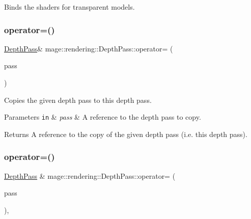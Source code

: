 Binds the shaders for transparent models. \mbox{\label{classmage_1_1rendering_1_1_depth_pass_a10cc86e94eb5425f0323b989c33514b7}} 
\subsubsection{\texorpdfstring{operator=()}{operator=()}\hspace{0.1cm}{\footnotesize\ttfamily [1/2]}}
{\footnotesize\ttfamily \mbox{\hyperlink{classmage_1_1rendering_1_1_depth_pass}{Depth\+Pass}}\& mage\+::rendering\+::\+Depth\+Pass\+::operator= (\begin{DoxyParamCaption}\item[{const \mbox{\hyperlink{classmage_1_1rendering_1_1_depth_pass}{Depth\+Pass}} \&}]{pass }\end{DoxyParamCaption})\hspace{0.3cm}{\ttfamily [delete]}}

Copies the given depth pass to this depth pass.


\begin{DoxyParams}[1]{Parameters}
\mbox{\tt in}  & {\em pass} & A reference to the depth pass to copy. \\
\hline
\end{DoxyParams}
\begin{DoxyReturn}{Returns}
A reference to the copy of the given depth pass (i.\+e. this depth pass). 
\end{DoxyReturn}
\mbox{\label{classmage_1_1rendering_1_1_depth_pass_a937bc6669a2bd856e7ff9c396e0afe77}} 
\subsubsection{\texorpdfstring{operator=()}{operator=()}\hspace{0.1cm}{\footnotesize\ttfamily [2/2]}}
{\footnotesize\ttfamily \mbox{\hyperlink{classmage_1_1rendering_1_1_depth_pass}{Depth\+Pass}} \& mage\+::rendering\+::\+Depth\+Pass\+::operator= (\begin{DoxyParamCaption}\item[{\mbox{\hyperlink{classmage_1_1rendering_1_1_depth_pass}{Depth\+Pass}} \&\&}]{pass }\end{DoxyParamCaption})\hspace{0.3cm}{\ttfamily [default]}, {\ttfamily [noexcept]}}

